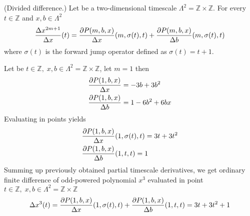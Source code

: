 \begin{cor}
    \label{finite_difference_case}
    (Divided difference.)
    Let be a two-dimensional timescale
    $\Lambda^2 = \mathbb{Z} \times \mathbb{Z}$.
    For every $t\in\mathbb{Z}$ and $x,b\in \Lambda^2$
    \begin{align*}
        \frac{\Delta x^{2m+1}}{\Delta x} (t)
        = \frac{\partial P ( m, b, x )}{\Delta x} (m, \sigma(t), t)
        + \frac{\partial P ( m, b, x )}{\Delta b}(m, \sigma(t), t)
    \end{align*}
    where $\sigma(t)$ is the forward jump operator defined as $\sigma(t) = t+1$.
\end{cor}
\begin{examp}
    \label{time_scale_z_example_1}
    Let be $t \in \mathbb{Z}, \; x,b \in \Lambda^2 = \mathbb{Z} \times \mathbb{Z}$, let $m=1$ then
    \begin{align*}
        &\frac{\partial P ( 1, b, x )}{\Delta x}                = -3 b + 3 b^2 \\
        &\frac{\partial P ( 1, b, x )}{\Delta b}                = 1 - 6 b^2 + 6 b x
    \end{align*}
    Evaluating in points yields
    \begin{align*}
        &\frac{\partial P ( 1, b, x )}{\Delta x} (1, \sigma(t), t) = 3 t + 3 t^2 \\
        &\frac{\partial P ( 1, b, x )}{\Delta b}(1, t,t)           = 1
    \end{align*}
    Summing up previously obtained partial timescale derivatives, we get ordinary finite difference of odd-powered polynomial
    $x^{3}$ evaluated in point $ t\in\mathbb{Z}, \; x,b\in\Lambda^2 = \mathbb{Z} \times \mathbb{Z}$
    \begin{align*}
        \Delta x^{3}(t)
        = \frac{\partial P ( 1, b, x )}{\Delta x} (1, \sigma(t), t)
        + \frac{\partial P ( 1, b, x )}{\Delta b}(1,t,t)
        = 3 t + 3 t^2 + 1
    \end{align*}
\end{examp}
